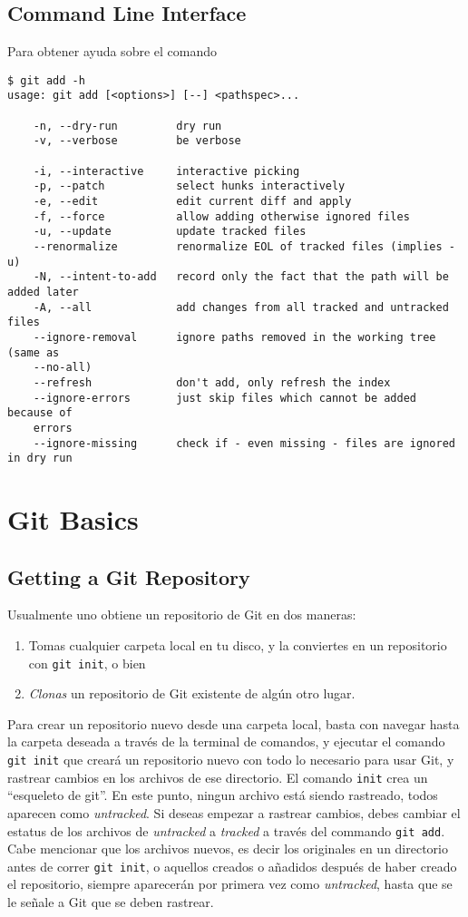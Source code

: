 \documentclass[spanish, 12pt, a4paper]{article}
\begin{document}
\subsection{Command Line Interface}

Para obtener ayuda sobre el comando

\begin{lstlisting}
$ git add -h
usage: git add [<options>] [--] <pathspec>...

	-n, --dry-run         dry run
	-v, --verbose         be verbose

	-i, --interactive     interactive picking
	-p, --patch           select hunks interactively
	-e, --edit            edit current diff and apply
	-f, --force           allow adding otherwise ignored files
	-u, --update          update tracked files
	--renormalize         renormalize EOL of tracked files (implies -u)
	-N, --intent-to-add   record only the fact that the path will be added later
	-A, --all             add changes from all tracked and untracked files
	--ignore-removal      ignore paths removed in the working tree (same as
	--no-all)
	--refresh             don't add, only refresh the index
	--ignore-errors       just skip files which cannot be added because of
	errors
	--ignore-missing      check if - even missing - files are ignored in dry run
\end{lstlisting}

\section{Git Basics}

\subsection{Getting a Git Repository}

Usualmente uno obtiene un repositorio de Git en dos maneras:

\begin{enumerate}
\item
  Tomas cualquier carpeta local en tu disco, y la conviertes en un
  repositorio con \texttt{git\ init}, o bien
\item
  \emph{Clonas} un repositorio de Git existente de algún otro lugar.
\end{enumerate}

Para crear un repositorio nuevo desde una carpeta local, basta con
navegar hasta la carpeta deseada a través de la terminal de comandos, y
ejecutar el comando \texttt{git\ init} que creará un repositorio nuevo
con todo lo necesario para usar Git, y rastrear cambios en los archivos
de ese directorio. El comando \texttt{init} crea un ``esqueleto de
git''. En este punto, ningun archivo está siendo rastreado, todos
aparecen como \emph{untracked}. Si deseas empezar a rastrear cambios,
debes cambiar el estatus de los archivos de \emph{untracked} a
\emph{tracked} a través del commando \texttt{git\ add}. Cabe mencionar
que los archivos nuevos, es decir los originales en un directorio antes
de correr \texttt{git\ init}, o aquellos creados o añadidos después de
haber creado el repositorio, siempre aparecerán por primera vez como
\emph{untracked}, hasta que se le señale a Git que se deben rastrear.
\end{document}
